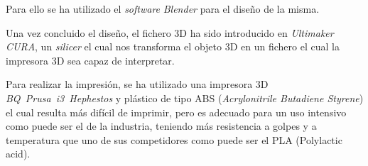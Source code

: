 Para ello se ha utilizado el \emph{software} \emph{Blender} para el diseño de la misma.


Una vez concluido el diseño, el fichero 3D ha sido introducido en \emph{Ultimaker CURA}, un \emph{silicer} el cual nos transforma el objeto 3D en un fichero el cual la impresora 3D sea capaz de interpretar.

Para realizar la impresión, se ha utilizado una impresora 3D \emph{BQ~Prusa~i3~Hephestos} y plástico de tipo ABS (\emph{Acrylonitrile Butadiene Styrene}) el cual resulta más difícil de imprimir, pero es adecuado para un uso intensivo como puede ser el de la industria, teniendo más resistencia a golpes y a temperatura que uno de sus competidores como puede ser el PLA (Polylactic acid).
